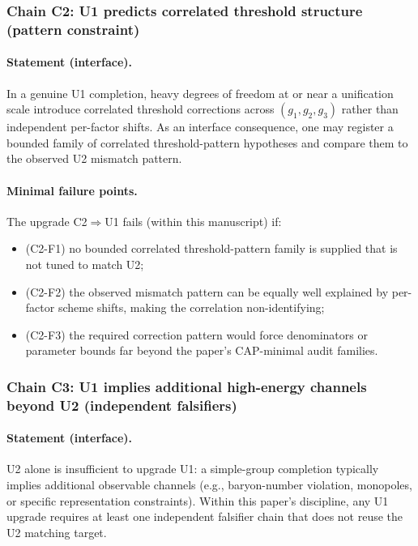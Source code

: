 \subsubsection{Chain C2: U1 predicts correlated threshold structure (pattern constraint)}
\paragraph{Statement (interface).}
\InterfaceTag In a genuine U1 completion, heavy degrees of freedom at or near a unification scale introduce correlated threshold corrections across $(g_1,g_2,g_3)$ rather than independent per-factor shifts.
As an interface consequence, one may register a bounded family of correlated threshold-pattern hypotheses and compare them to the observed U2 mismatch pattern.

\paragraph{Minimal failure points.}
\AuditTag The upgrade C2$\Rightarrow$U1 fails (within this manuscript) if:
\begin{itemize}
\item (C2-F1) no bounded correlated threshold-pattern family is supplied that is not tuned to match U2;
\item (C2-F2) the observed mismatch pattern can be equally well explained by per-factor scheme shifts, making the correlation non-identifying;
\item (C2-F3) the required correction pattern would force denominators or parameter bounds far beyond the paper's CAP-minimal audit families.
\end{itemize}

\subsubsection{Chain C3: U1 implies additional high-energy channels beyond U2 (independent falsifiers)}
\paragraph{Statement (interface).}
\InterfaceTag U2 alone is insufficient to upgrade U1: a simple-group completion typically implies additional observable channels (e.g., baryon-number violation, monopoles, or specific representation constraints).
Within this paper's discipline, any U1 upgrade requires at least one independent falsifier chain that does not reuse the U2 matching target.

